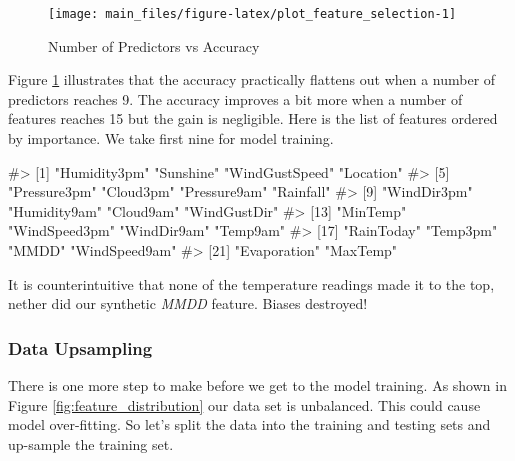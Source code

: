 \begin{Schunk}
\begin{figure}[H]

{\centering \texttt{[image: main\_files/figure-latex/plot\_feature\_selection-1]} 

}

\caption[Number of Predictors vs Accuracy]{Number of Predictors vs Accuracy}\label{fig:plot_feature_selection}
\end{figure}
\end{Schunk}

Figure \ref{fig:plot_feature_selection} illustrates that the accuracy
practically flattens out when a number of predictors reaches 9. The
accuracy improves a bit more when a number of features reaches 15 but
the gain is negligible. Here is the list of features ordered by
importance. We take first nine for model training.

\begin{Schunk}
\begin{Soutput}
#>  [1] "Humidity3pm"   "Sunshine"      "WindGustSpeed" "Location"     
#>  [5] "Pressure3pm"   "Cloud3pm"      "Pressure9am"   "Rainfall"     
#>  [9] "WindDir3pm"    "Humidity9am"   "Cloud9am"      "WindGustDir"  
#> [13] "MinTemp"       "WindSpeed3pm"  "WindDir9am"    "Temp9am"      
#> [17] "RainToday"     "Temp3pm"       "MMDD"          "WindSpeed9am" 
#> [21] "Evaporation"   "MaxTemp"
\end{Soutput}
\end{Schunk}

It is counterintuitive that none of the temperature readings made it to
the top, nether did our synthetic \emph{MMDD} feature. Biases destroyed!

\hypertarget{data-upsampling}{%
\subsubsection{Data Upsampling}\label{data-upsampling}}

There is one more step to make before we get to the model training. As
shown in Figure \ref{fig:feature_distribution} our data set is
unbalanced. This could cause model over-fitting. So let's split the data
into the training and testing sets and up-sample the training set.

